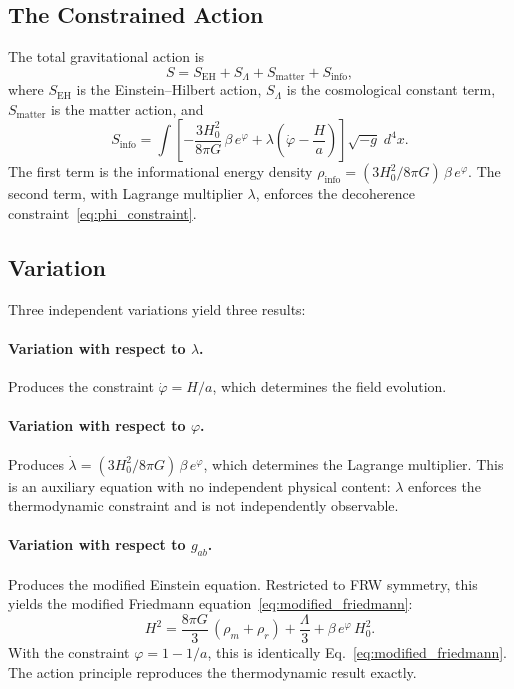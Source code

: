 \documentclass[11pt]{article}
\begin{document}
\subsection{The Constrained Action}

The total gravitational action is
\begin{equation}
S = S_\mathrm{EH} + S_\Lambda + S_\mathrm{matter} + S_\mathrm{info},
\label{eq:total_action}
\end{equation}
where $S_\mathrm{EH}$ is the Einstein--Hilbert action, $S_\Lambda$ is the
cosmological constant term, $S_\mathrm{matter}$ is the matter action, and
\begin{equation}
S_\mathrm{info} = \int\!\left[
  -\frac{3H_0^2}{8\pi G}\,\beta\,e^{\varphi}
  + \lambda\!\left(\dot{\varphi} - \frac{H}{a}\right)
\right]\sqrt{-g}\;d^4x.
\label{eq:Sinfo}
\end{equation}
The first term is the informational energy density
$\rho_\mathrm{info} = (3H_0^2/8\pi G)\,\beta\,e^{\varphi}$.  The second
term, with Lagrange multiplier $\lambda$, enforces the decoherence
constraint~\eqref{eq:phi_constraint}.

\subsection{Variation}

Three independent variations yield three results:

\paragraph{Variation with respect to $\lambda$.}
Produces the constraint $\dot{\varphi} = H/a$, which determines the field
evolution.

\paragraph{Variation with respect to $\varphi$.}
Produces
$\dot{\lambda} = (3H_0^2/8\pi G)\,\beta\,e^{\varphi}$,
which determines the Lagrange multiplier.  This is an auxiliary equation
with no independent physical content: $\lambda$ enforces the thermodynamic
constraint and is not independently observable.

\paragraph{Variation with respect to $g_{ab}$.}
Produces the modified Einstein equation.  Restricted to FRW symmetry, this
yields the modified Friedmann equation~\eqref{eq:modified_friedmann}:
\begin{equation}
H^2 = \frac{8\pi G}{3}\,(\rho_m + \rho_r) + \frac{\Lambda}{3}
  + \beta\,e^{\varphi}\,H_0^2.
\end{equation}
With the constraint $\varphi = 1 - 1/a$, this is identically
Eq.~\eqref{eq:modified_friedmann}.  The action principle reproduces the
thermodynamic result exactly.
\end{document}
